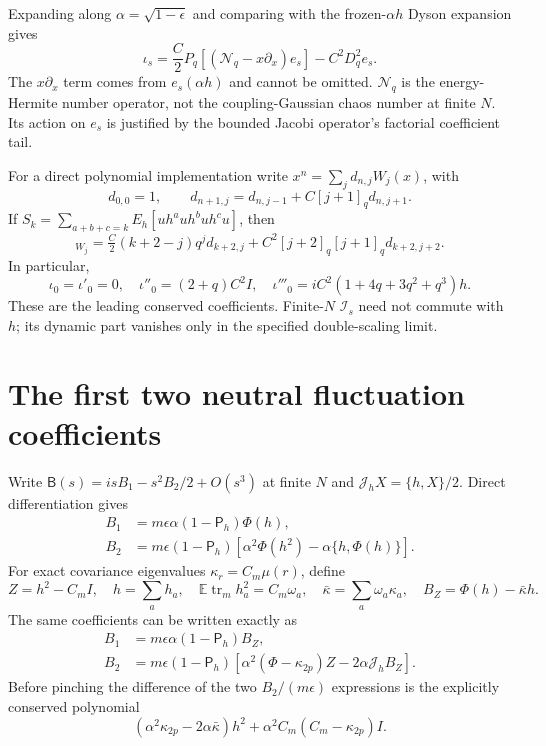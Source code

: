 \documentclass[11pt,a4paper]{article}
\newcommand{\EE}{\mathbb E}
\newcommand{\tr}{\operatorname{tr}}
\newcommand{\PP}{\mathsf P_h}
\newcommand{\BB}{\mathsf B}
\newcommand{\Jh}{\mathcal J_h}
\begin{document}
Expanding along $\alpha=\sqrt{1-\epsilon}$ and comparing with the
frozen-$\alpha h$ Dyson expansion gives
\begin{equation}
 \boxed{\quad
 \iota_s=\frac C2P_q[(\mathcal N_q-x\partial_x)e_s]
                   -C^2D_q^2e_s.\quad}
 \label{eq:iota}
\end{equation}
The $x\partial_x$ term comes from $e_s(\alpha h)$ and cannot be
omitted. $\mathcal N_q$ is the energy-Hermite number operator,
not the coupling-Gaussian chaos number at finite $N$.
Its action on $e_s$ is justified by the bounded Jacobi operator's
factorial coefficient tail.

For a direct polynomial implementation write
$x^n=\sum_jd_{n,j}W_j(x)$, with
\begin{equation}
 d_{0,0}=1,\qquad d_{n+1,j}=d_{n,j-1}+C[j+1]_qd_{n,j+1}.
\end{equation}
If $S_k=\sum_{a+b+c=k}E_h[u h^a u h^b u h^c u]$, then
\begin{equation}
 [S_k]_{W_j}=\tfrac C2(k+2-j)q^j d_{k+2,j}
            +C^2[j+2]_q[j+1]_q d_{k+2,j+2}.
\end{equation}
In particular,
\begin{equation}
 \iota_0=\iota'_0=0,\quad \iota''_0=(2+q)C^2I,\quad
 \iota'''_0=iC^2(1+4q+3q^2+q^3)h.
\end{equation}
These are the leading conserved coefficients. Finite-$N$ $\mathcal I_s$
need not commute with $h$; its dynamic part vanishes only in the
specified double-scaling limit.

\newpage
\section{The first two neutral fluctuation coefficients}
Write $\BB(s)=isB_1-s^2B_2/2+O(s^3)$ at finite $N$ and
$\Jh X=\{h,X\}/2$. Direct differentiation gives
\begin{align}
 B_1&=m\epsilon\alpha(1-\PP)\Phi(h),\\
 B_2&=m\epsilon(1-\PP)[\alpha^2\Phi(h^2)-\alpha\{h,\Phi(h)\}].
\end{align}
For exact covariance eigenvalues $\kappa_r=C_m\mu(r)$, define
\begin{equation}
 Z=h^2-C_mI,\quad h=\sum_a h_a,\quad
 \EE\tr_m h_a^2=C_m\omega_a,\quad
 \bar\kappa=\sum_a\omega_a\kappa_a,\quad B_Z=\Phi(h)-\bar\kappa h.
\end{equation}
The same coefficients can be written exactly as
\begin{align}
 B_1&=m\epsilon\alpha(1-\PP)B_Z,\\
 B_2&=m\epsilon(1-\PP)
       [\alpha^2(\Phi-\kappa_{2p})Z-2\alpha\Jh B_Z].
 \label{eq:B2exact}
\end{align}
Before pinching the difference of the two $B_2/(m\epsilon)$
expressions is the explicitly conserved polynomial
\begin{equation}
 (\alpha^2\kappa_{2p}-2\alpha\bar\kappa)h^2
       +\alpha^2C_m(C_m-\kappa_{2p})I.
\end{equation}
\end{document}
